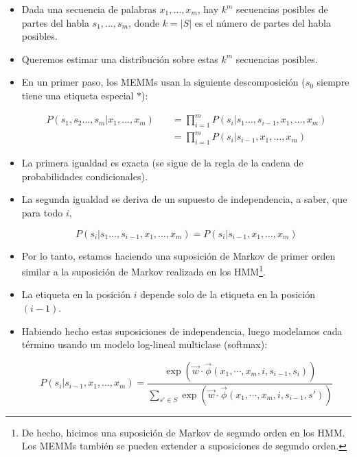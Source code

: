 \begin{itemize}
\item Dada una secuencia de palabras $x_1, \dots, x_m$, hay $k^m$ secuencias posibles de partes del habla $s_1, \dots, s_m$, donde $k = |S|$ es el número de partes del habla posibles.

\item Queremos estimar una distribución sobre estas $k^m$ secuencias posibles.

\item En un primer paso, los MEMMs usan la siguiente descomposición ($s_0$ siempre tiene una etiqueta especial $*$):

\begin{equation}
\begin{split}
P(s_1,s_2 \dots, s_m | x_1, \dots, x_m) \quad & = \prod_{i=1}^{m}    P(s_i | s_1 \dots, s_{i-1}, x_1, \dots, x_m)\\
\quad & = \prod_{i=1}^{m}    P(s_i | s_{i-1}, x_1, \dots, x_m)
\end{split}
\end{equation}

\item La primera igualdad es exacta (se sigue de la regla de la cadena de probabilidades condicionales).

\item La segunda igualdad se deriva de un supuesto de independencia, a saber, que para todo $i$,

\begin{displaymath}
P(s_i | s_1 \dots, s_{i-1}, x_1, \dots, x_m) = P(s_i | s_{i-1}, x_1, \dots, x_m)
\end{displaymath}

\item Por lo tanto, estamos haciendo una suposición de Markov de primer orden similar a la suposición de Markov realizada en los HMM\footnote{De hecho, hicimos una suposición de Markov de segundo orden en los HMM. Los MEMMs también se pueden extender a suposiciones de segundo orden.}.

\item La etiqueta en la posición $i$ depende solo de la etiqueta en la posición $(i-1)$.

\item Habiendo hecho estas suposiciones de independencia, luego modelamos cada término usando un modelo log-lineal multiclase (softmax):

\begin{equation}
P(s_i | s_{i-1}, x_1, \dots, x_m) = \frac{\exp (\vec{w}\cdot \vec{\phi}(x_1, \cdots, x_m, i, s_{i-1},s_i))}{\sum_{s' \in S} \exp (\vec{w}\cdot \vec{\phi}(x_1, \cdots, x_m, i, s_{i-1},s'))}
\end{equation}

\end{itemize}

